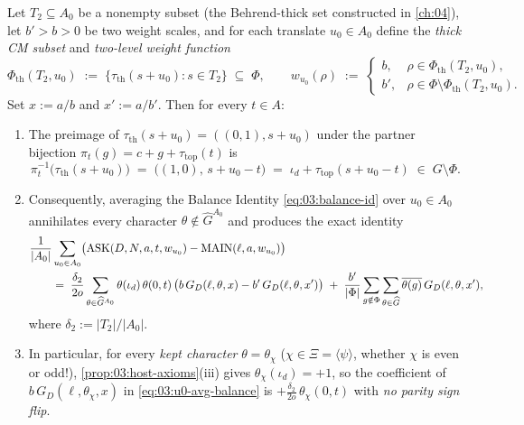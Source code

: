 \begin{proposition}
\label{prop:03:thick-avg}
Let $T_2 \subseteq A_0$ be a nonempty subset (the Behrend-thick set constructed in \cref{ch:04}), let $b' > b > 0$ be two weight scales, and for each translate $u_0 \in A_0$ define the \emph{thick CM subset} and \emph{two-level weight function}
\begin{equation}
\label{eq:03:two-level-weight}
  \Phi_{\mathrm{th}}(T_2, u_0) \;:=\; \bigl\{\tau_{\mathrm{th}}(s + u_0) : s \in T_2\bigr\} \;\subseteq\; \Phi,
  \qquad
  w_{u_0}(\rho) \;:=\; \begin{cases} b, & \rho \in \Phi_{\mathrm{th}}(T_2, u_0), \\ b', & \rho \in \Phi \setminus \Phi_{\mathrm{th}}(T_2, u_0). \end{cases}
\end{equation}
Set $x := a / b$ and $x' := a / b'$. Then for every $t \in A$:
\begin{enumerate}[label=\textup{(\roman*)}]
\item The preimage of $\tau_{\mathrm{th}}(s + u_0) = ((0, 1), s + u_0)$ under the partner bijection $\pi_t(g) = c + g + \tau_{\mathrm{top}}(t)$ is
  \begin{equation}
  \label{eq:03:thick-preimage}
    \pi_t^{-1}\bigl(\tau_{\mathrm{th}}(s + u_0)\bigr) \;=\; \bigl((1, 0),\, s + u_0 - t\bigr) \;=\; \iota_d + \tau_{\mathrm{top}}(s + u_0 - t) \;\in\; G \setminus \Phi.
  \end{equation}
\item Consequently, averaging the Balance Identity \eqref{eq:03:balance-id} over $u_0 \in A_0$ annihilates every character $\theta \notin \widehat{G}^{A_0}$ and produces the exact identity
  \begin{align}
  \label{eq:03:u0-avg-balance}
    &\frac{1}{|A_0|}\sum_{u_0 \in A_0} \bigl(\mathrm{ASK}(D, N, a, t, w_{u_0}) - \mathrm{MAIN}(\ell, a, w_{u_0})\bigr) \notag\\
    &\qquad =\; \frac{\delta_2}{2o} \sum_{\theta \in \widehat{G}^{A_0}} \theta(\iota_d)\,\theta(0, t)\,\bigl(b\, G_D(\ell, \theta, x) - b'\, G_D(\ell, \theta, x')\bigr)
    \;+\; \frac{b'}{|\Phi|}\sum_{g \notin \Phi}\sum_{\theta \in \widehat{G}} \overline{\theta(g)}\, G_D(\ell, \theta, x'),
  \end{align}
  where $\delta_2 := |T_2| / |A_0|$.
\item In particular, for every \emph{kept character} $\theta = \theta_\chi$ ($\chi \in \Xi = \langle \psi \rangle$, whether $\chi$ is even or odd!), \cref{prop:03:host-axioms}(iii) gives $\theta_\chi(\iota_d) = +1$, so the coefficient of $b\, G_D(\ell, \theta_\chi, x)$ in \eqref{eq:03:u0-avg-balance} is $+\frac{\delta_2}{2o}\,\theta_\chi(0, t)$ with \emph{no parity sign flip}.
\end{enumerate}
\end{proposition}

